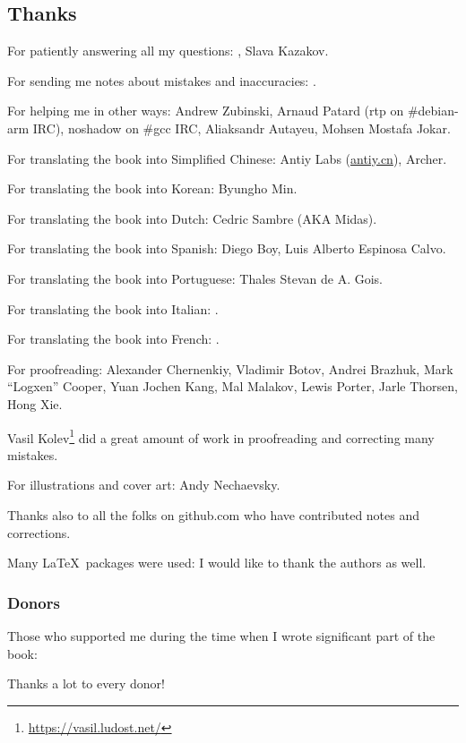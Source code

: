 \subsection*{Thanks}

For patiently answering all my questions: \HERMIT, Slava  Kazakov.

For sending me notes about mistakes and inaccuracies: \PeopleMistakesInaccuracies{}.

For helping me in other ways:
Andrew Zubinski,
Arnaud Patard (rtp on \#debian-arm IRC),
noshadow on \#gcc IRC,
Aliaksandr Autayeu,
Mohsen Mostafa Jokar.

For translating the book into Simplified Chinese:
Antiy Labs (\href{http://antiy.cn}{antiy.cn}), Archer.

For translating the book into Korean: Byungho Min.

For translating the book into Dutch: Cedric Sambre (AKA Midas).

For translating the book into Spanish: Diego Boy, Luis Alberto Espinosa Calvo.

For translating the book into Portuguese: Thales Stevan de A. Gois.

For translating the book into Italian: \PeopleItalianTranslators{}.

For translating the book into French: \PeopleFrenchTranslators{}.

For proofreading:
Alexander  Chernenkiy,
Vladimir Botov,
Andrei Brazhuk,
Mark ``Logxen'' Cooper, Yuan Jochen Kang, Mal Malakov, Lewis Porter, Jarle Thorsen, Hong Xie.

Vasil Kolev\footnote{\url{https://vasil.ludost.net/}} did a great amount of work in proofreading and correcting many mistakes.

For illustrations and cover art: Andy Nechaevsky.

Thanks also to all the folks on github.com who have contributed notes and corrections.

Many \LaTeX\ packages were used: I would like to thank the authors as well.

\subsubsection*{Donors}

Those who supported me during the time when I wrote significant part of the book:



Thanks a lot to every donor!
